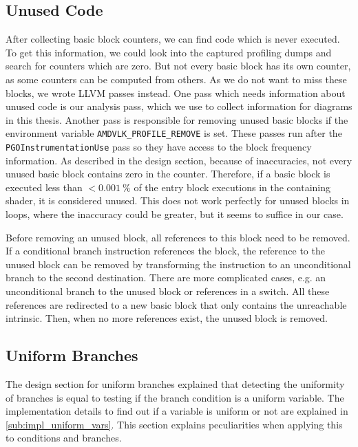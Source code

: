 \subsection{Unused Code}
\label{sub:impl_unused_code}
After collecting basic block counters, we can find code which is never executed.
To get this information, we could look into the captured profiling dumps and search for counters which are zero. But not every basic block has its own counter, as some counters can be computed from others.
As we do not want to miss these blocks, we wrote LLVM passes instead.
One pass which needs information about unused code is our analysis pass, which we use to collect information for diagrams in this thesis.
Another pass is responsible for removing unused basic blocks if the environment variable \texttt{AMDVLK\_PROFILE\_REMOVE} is set.
These passes run after the \texttt{PGOInstrumentationUse} pass so they have access to the block frequency information.
As described in the design section, because of inaccuracies, not every unused basic block contains zero in the counter.
Therefore, if a basic block is executed less than $< \SI{0.001}{\percent}$ of the entry block executions in the containing shader, it is considered unused.
This does not work perfectly for unused blocks in loops, where the inaccuracy could be greater, but it seems to suffice in our case.

Before removing an unused block, all references to this block need to be removed.
If a conditional branch instruction references the block, the reference to the unused block can be removed by transforming the instruction to an unconditional branch to the second destination.
There are more complicated cases, e.g. an unconditional branch to the unused block or references in a switch.
All these references are redirected to a new basic block that only contains the unreachable intrinsic.
Then, when no more references exist, the unused block is removed.

\subsection{Uniform Branches}
\label{sub:impl_uniform_branches}
The design section for uniform branches explained that detecting the uniformity of branches is equal to testing if the branch condition is a uniform variable.
The implementation details to find out if a variable is uniform or not are explained in \cref{sub:impl_uniform_vars}.
This section explains peculiarities when applying this to conditions and branches.

